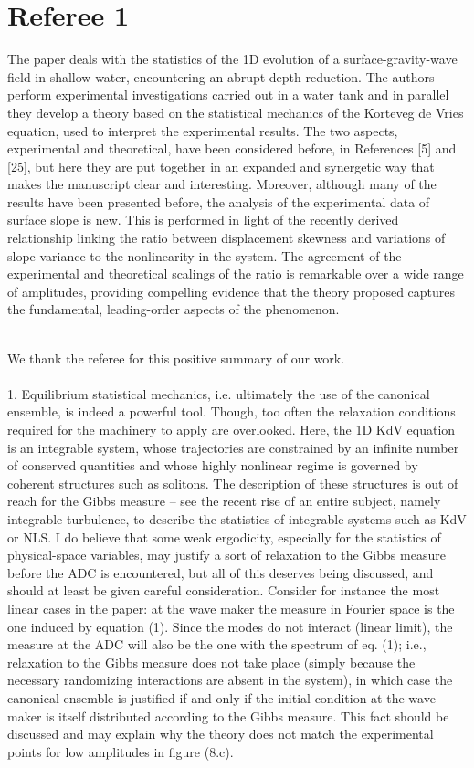 \documentclass[11pt]{article}
\newcommand{\comment}[1]{{\color{blue} #1}}
\begin{document}
\section*{Referee 1}

\noindent
\comment{The paper deals with the statistics of the 1D evolution of a surface-gravity-wave field in shallow water, encountering an abrupt depth reduction. The authors perform experimental investigations carried out in a water tank and in parallel they develop a theory based on the statistical mechanics of the Korteveg de Vries equation, used to interpret the experimental results. The two aspects, experimental and theoretical, have been considered before, in References [5] and [25], but here they are put together in an expanded and synergetic way that makes the manuscript clear and interesting. Moreover, although many of the results have been presented before, the analysis of the experimental data of surface slope is new. This is performed in light of the recently derived relationship linking the ratio between displacement skewness and variations of slope variance to the nonlinearity in the system. The agreement of the experimental and theoretical scalings of the ratio is remarkable over a wide range of amplitudes, providing compelling evidence that the theory proposed captures the fundamental, leading-order aspects of the phenomenon.
}

\noindent
\\We thank the referee for this positive summary of our work. \\ \\


\noindent
\comment{
1. Equilibrium statistical mechanics, i.e. ultimately the use of the canonical ensemble, is indeed a powerful tool. Though, too often the relaxation conditions required for the machinery to apply are overlooked. Here, the 1D KdV equation is an integrable system, whose trajectories are constrained by an infinite number of conserved quantities and whose highly nonlinear regime is governed by coherent structures such as solitons. The description of these structures is out of reach for the Gibbs measure – see the recent rise of an entire subject, namely integrable turbulence, to describe the statistics of integrable systems such as KdV or NLS. I do believe that some weak ergodicity, especially for the statistics of physical-space variables, may justify a sort of relaxation to the Gibbs measure before the ADC is encountered, but all of this deserves being discussed, and should at least be given careful consideration. Consider for instance the most linear cases in the paper: at the wave maker the measure in Fourier space is the one induced by equation (1). Since the modes do not interact (linear limit), the measure at the ADC will also be the one with the spectrum of eq. (1); i.e., relaxation to the Gibbs measure does not take place (simply because the necessary randomizing interactions are absent in the system), in which case the canonical ensemble is justified if and only if the initial condition at the wave maker is itself distributed according to the Gibbs measure. This fact should be discussed and may explain why the theory does not match the experimental points for low amplitudes in figure (8.c).}
\end{document}
